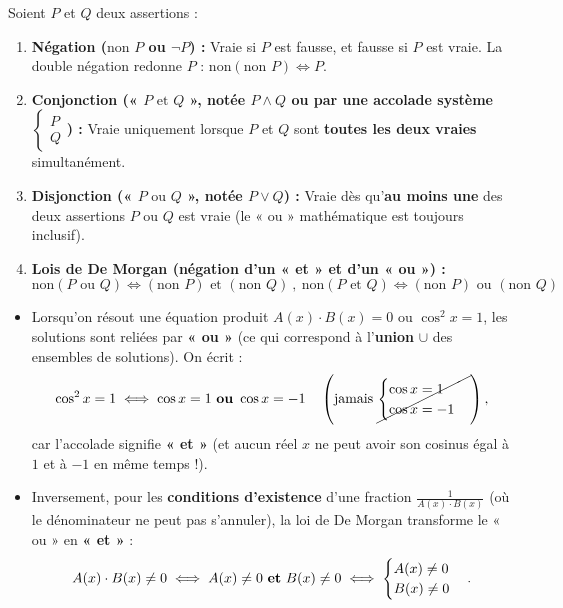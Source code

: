 \begin{theoreme}
Soient $P$ et $Q$ deux assertions :
\begin{enumerate}
    \item \textbf{Négation ($\text{non } P$ ou $\neg P$) :} Vraie si $P$ est fausse, et fausse si $P$ est vraie. La double négation redonne $P$ : $\text{non}(\text{non } P) \iff P$.
    \item \textbf{Conjonction (« $P \text{ et } Q$ », notée $P \wedge Q$ ou par une accolade système $\begin{cases} P \\ Q \end{cases}$) :} Vraie uniquement lorsque $P$ et $Q$ sont \textbf{toutes les deux vraies} simultanément.
    \item \textbf{Disjonction (« $P \text{ ou } Q$ », notée $P \vee Q$) :} Vraie dès qu'\textbf{au moins une} des deux assertions $P$ ou $Q$ est vraie (le « ou » mathématique est toujours inclusif).
    \item \textbf{Lois de De Morgan (négation d'un « et » et d'un « ou ») :}
    \[
        \boxed{\text{non}(P \text{ ou } Q) \iff (\text{non } P) \text{ et } (\text{non } Q)} \ , \ \boxed{\text{non}(P \text{ et } Q) \iff (\text{non } P) \text{ ou } (\text{non } Q)}
    \]
\end{enumerate}
\end{theoreme}

\begin{attention}
\begin{itemize}
    \item Lorsqu'on résout une équation produit $A(x)\cdot B(x) = 0$ ou $\cos^2 x = 1$, les solutions sont reliées par \textbf{« ou »} (ce qui correspond à l'\textbf{union} $\cup$ des ensembles de solutions). On écrit :
    \[
        \cos^2 x = 1 \iff \cos x = 1 \text{ \textbf{ou} } \cos x = -1 \quad \left(\text{jamais } \cancel{\begin{cases} \cos x = 1 \\ \cos x = -1 \end{cases}}\right),
    \]
    car l'accolade signifie \textbf{« et »} (et aucun réel $x$ ne peut avoir son cosinus égal à $1$ et à $-1$ en même temps !).
    \item Inversement, pour les \textbf{conditions d'existence} d'une fraction $\frac{1}{A(x)\cdot B(x)}$ (où le dénominateur ne peut pas s'annuler), la loi de De Morgan transforme le « ou » en \textbf{« et »} :
    \[
        A(x)\cdot B(x) \neq 0 \iff A(x) \neq 0 \text{ \textbf{et} } B(x) \neq 0 \iff \begin{cases} A(x) \neq 0 \\ B(x) \neq 0 \end{cases}.
    \]
\end{itemize}
\end{attention}

